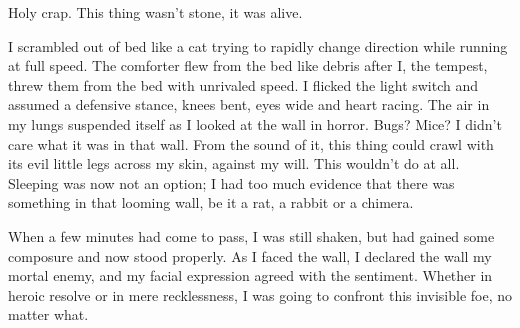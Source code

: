 \documentclass[12pt]{article}
\begin{document}
Holy crap.  This thing wasn't stone, it was alive.

I scrambled out of bed like a cat trying to rapidly change direction while running at full speed.  The comforter flew from the bed like debris after I, the tempest, threw them from the bed with unrivaled speed.  I flicked the light switch and assumed a defensive stance, knees bent, eyes wide and heart racing. The air in my lungs suspended itself as I looked at the wall in horror.  Bugs?  Mice?  I didn't care what it was in that wall.  From the sound of it, this thing could crawl with its evil little legs across my skin, against my will.  This wouldn't do at all.  Sleeping was now not an option;  I had too much evidence that there was something in that looming wall, be it a rat, a rabbit or a chimera.

When a few minutes had come to pass, I was still shaken, but had gained some composure and now stood properly.  As I faced the wall, I declared the wall my mortal enemy, and my facial expression agreed with the sentiment.  Whether in heroic resolve or in mere recklessness, I was going to confront this invisible foe, no matter what.
\end{document}
